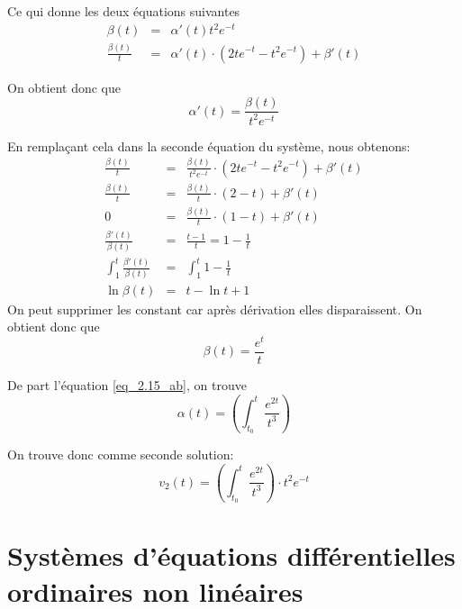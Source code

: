 \documentclass[fontsize=12pt]{article}
\begin{document}
 Ce qui donne les deux équations suivantes
 \begin{eqnarray}
\beta(t)&=&\alpha'(t)t^2e^{-t}\\
\frac{\beta(t)}{t}&=&\alpha'(t)\cdot \left( 2t e^{-t} -t^2 e^{-t}  \right) +\beta'(t)
\end{eqnarray}

On obtient donc que
\begin{equation}
\alpha'(t) = \frac{\beta(t)}{t^2 e^{-t}} \label{eq_2.15_ab}
\end{equation}

En remplaçant cela dans la seconde équation du système, nous obtenons:
\begin{eqnarray*}
\frac{\beta(t)}{t}&=&\frac{\beta(t)}{t^2 e^{-t}}\cdot \left( 2t e^{-t} -t^2 e^{-t}  \right) +\beta'(t)\\
\frac{\beta(t)}{t}&=&\frac{\beta(t)}{t}\cdot \left( 2-t  \right) +\beta'(t)\\
0&=& \frac{\beta(t)}{t}\cdot \left( 1-t  \right)+\beta'(t)\\
\frac{\beta'(t)}{\beta(t)}&=&\frac{t-1}{t} = 1-\frac{1}{t}\\
\int_1^t \frac{\beta'(t)}{\beta(t)} &=& \int_1^t1-\frac{1}{t}\\
\ln{\beta(t)} &=& t-\ln t + 1
\end{eqnarray*}
On peut supprimer les constant car après dérivation elles disparaissent. On obtient donc que
\begin{equation}
\beta(t) = \frac{e^{t}}{t}
\end{equation}

De part l'équation \ref{eq_2.15_ab}, on trouve
\begin{equation}
\alpha(t)= \left( \int_{t_0}^t \frac{e^{2t}}{t^3} \right)
\end{equation}

On trouve donc comme seconde solution:
\begin{equation}
v_2(t) = \left( \int_{t_0}^t \frac{e^{2t}}{t^3} \right) \cdot t^2 e^{-t}
\end{equation}


\section{Systèmes d'équations différentielles ordinaires non linéaires}
\end{document}
